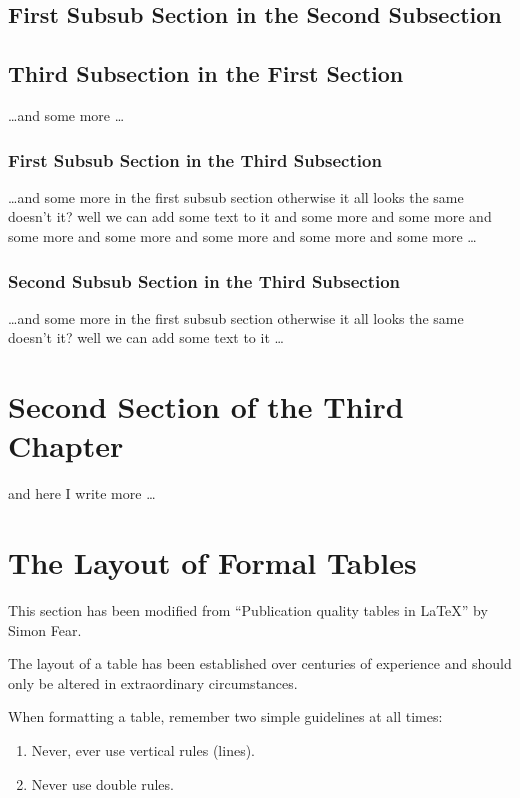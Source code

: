 \subsection{First Subsub Section in the Second Subsection}

\subsection{Third Subsection in the First Section}
\dots and some more \dots

\subsubsection{First Subsub Section in the Third Subsection}
\dots and some more in the first subsub section otherwise it all looks the same
doesn't it? well we can add some text to it and some more and some more and
some more and some more and some more and some more and some more \dots

\subsubsection{Second Subsub Section in the Third Subsection}
\dots and some more in the first subsub section otherwise it all looks the same
doesn't it? well we can add some text to it \dots

\section{Second Section of the Third Chapter}
and here I write more \dots

\section{The Layout of Formal Tables}
This section has been modified from ``Publication quality tables in \LaTeX*''
 by Simon Fear.

The layout of a table has been established over centuries of experience and
should only be altered in extraordinary circumstances.

When formatting a table, remember two simple guidelines at all times:

\begin{enumerate}
  \item Never, ever use vertical rules (lines).
  \item Never use double rules.
\end{enumerate}

